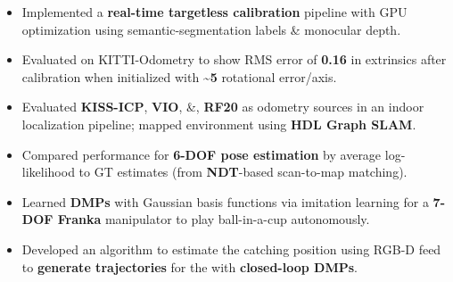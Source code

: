 

{    \begin{itemize}
        \item Implemented a \textbf{real-time targetless calibration} pipeline with GPU optimization using semantic-segmentation labels \& monocular depth.
        \item Evaluated on KITTI-Odometry to show RMS error of \textbf{0.16\degree} in extrinsics after calibration when initialized with \textbf{\textasciitilde5\degree} rotational error/axis.
    \end{itemize}}
\divider

{    \begin{itemize}
        \item Evaluated \textbf{KISS-ICP}, \textbf{VIO}, \&, \textbf{RF20} as odometry sources in an indoor localization pipeline; mapped environment using \textbf{HDL Graph SLAM}.
        \item Compared performance for \textbf{6-DOF pose estimation} by average log-likelihood to GT estimates (from \textbf{NDT}-based scan-to-map matching).
        
    \end{itemize}}
\divider

  {  \begin{itemize}
        \item Learned \textbf{DMPs} with Gaussian basis functions via imitation learning for a \textbf{7-DOF Franka} manipulator to play ball-in-a-cup autonomously.
        \item Developed an algorithm to estimate the catching position using RGB-D feed to \textbf{generate trajectories} for the with \textbf{closed-loop DMPs}.
    \end{itemize}}
\divider

